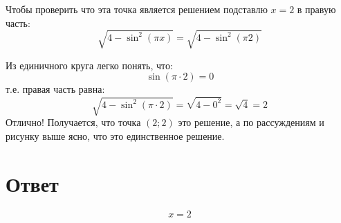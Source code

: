 \documentclass{article}
\begin{document}
Чтобы проверить что эта точка является решением подставлю $x=2$ в правую часть:
$$\sqrt{4-\sin^2(\pi{}x)}=\sqrt{4-\sin^2(\pi{}2)}$$

Из единичного круга легко понять, что:
$$\sin(\pi\cdot{}2)=0$$
т.е. правая часть равна:
$$\sqrt{4-\sin^2(\pi\cdot{}2)}=\sqrt{4-0^2}=\sqrt{4}=2$$
Отлично! Получается, что точка $(2;2)$ это решение, а по рассуждениям и рисунку выше ясно, что это единственное решение.

\section{Ответ}
$$x=2$$
\end{document}
